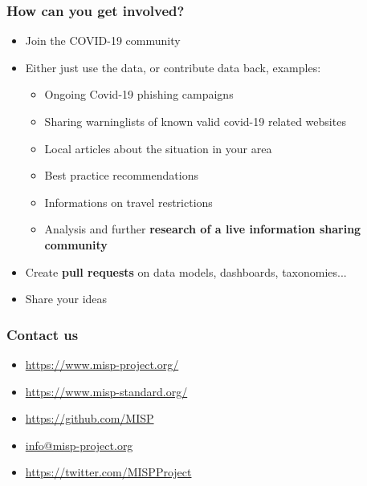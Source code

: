 \begin{frame}
\frametitle{How can you get involved?}
    \begin{itemize}
        \item Join the COVID-19 community
        \item Either just use the data, or contribute data back, examples:
        \begin{itemize}
            \item Ongoing Covid-19 phishing campaigns
            \item Sharing warninglists of known valid covid-19 related websites
            \item Local articles about the situation in your area
            \item Best practice recommendations
            \item Informations on travel restrictions
            \item Analysis and further {\bf research of a live information sharing community}
        \end{itemize}
        \item Create {\bf pull requests} on data models, dashboards, taxonomies...
        \item Share your ideas
    \end{itemize}
\end{frame}

\begin{frame}
  \frametitle{Contact us}
  \begin{itemize}
    \item \url{https://www.misp-project.org/}
    \item \url{https://www.misp-standard.org/}
    \item \url{https://github.com/MISP}
    \item \url{info@misp-project.org}
    \item \url{https://twitter.com/MISPProject}
  \end{itemize}
\end{frame}


